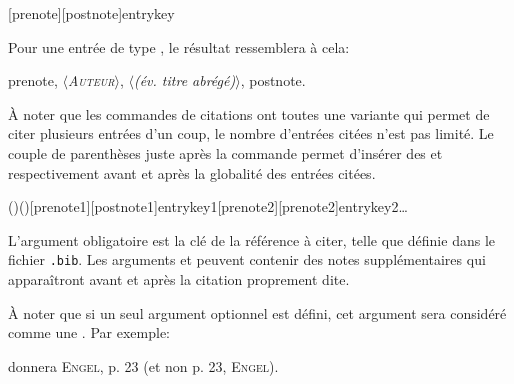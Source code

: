 \documentclass[a4paper]{ltxdockit}[2011/03/25]
\newcommand{\bib}{\texttt{.bib}\xspace}
\newcommand{\Pex}{\textnormal{Par exemple}\xspace}
\newcommand{\variable}[1]{$\langle$\textsl{#1}$\rangle$}
\begin{document}
\begin{ltxsyntax}
[prenote][postnote]{entrykey}
\end{ltxsyntax}

Pour une entrée de type , le résultat ressemblera à cela:

prenote, \variable{\textsc{Auteur}}, \variable{\emph{(év. titre abrégé)}}, postnote.

À noter que les commandes de citations ont toutes une variante qui permet de citer plusieurs entrées d'un coup, le nombre d'entrées citées n'est pas limité. Le couple de parenthèses juste après la commande  permet d'insérer des  et  respectivement avant et après la globalité des entrées citées.

\begin{ltxsyntax}
()()[prenote1][postnote1]{entrykey1}[prenote2][prenote2]{entrykey2}…
\end{ltxsyntax}

L'argument obligatoire  est la clé de la référence à citer, telle que définie dans le fichier \bib. Les arguments  et  peuvent contenir des notes supplémentaires qui apparaîtront avant et après la citation proprement dite.

À noter que si un seul argument optionnel est défini, cet argument sera considéré comme une . \Pex: 


donnera \textsc{Engel}, p. 23 (et non p. 23, \textsc{Engel}).
\end{document}

